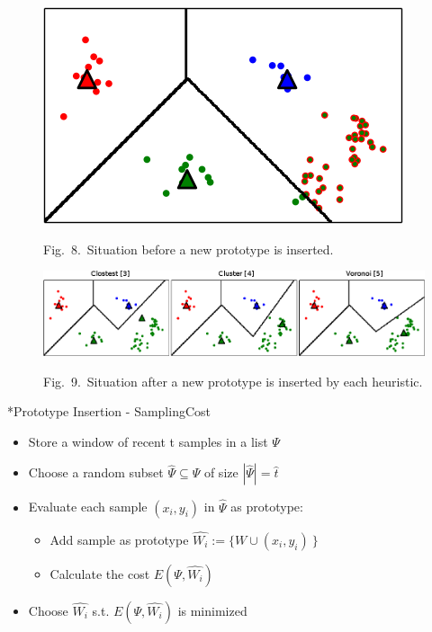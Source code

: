 \documentclass{article}
\makeatletter
\renewcommand{\subsection}{%
\@startsection{subsection}{1}{0pt}{2ex}{1ex}{%
\color[rgb]{0,0.4078,0.7059}
\fontsize{11mm}{11mm}\sffamily\bfseries}}
\makeatother
\begin{document}
\begin{multicols}{3}
\begin{minipage}[c]{0.58\linewidth}
\end{minipage}
\begin{minipage}[c]{0.4\linewidth}
\begin{figure}[H]
\begin{center}
\includegraphics[width=1\linewidth]{Images/General/Insertions1.png}
\end{center}
{\myCaption Fig.~8.~Situation before a new prototype is inserted.}
\end{figure}
\end{minipage}

\begin{figure}[H]
\includegraphics[width=1\linewidth]{Images/General/PlacementHeuristics.png}
\begin{center}
{\myCaption Fig.~9.~Situation after a new prototype is inserted by each heuristic.} 
\end{center}
\end{figure}


\subsection*{Prototype Insertion - SamplingCost}
\begin{itemize}
	\item Store a window of recent t samples in a list $\Psi$
	\item Choose a random subset $\hat{\Psi}\subseteq \Psi$ of size $|\hat{\Psi}|=\hat{t}$
	\item Evaluate each sample $(x_i,y_i)$ in $\hat{\Psi}$ as prototype:
	\begin{itemize}
	\item Add sample as prototype $\hat{W_i}:= \{W\cup (x_i,y_i)\ \}$
	\item Calculate the cost $E(\Psi, \hat{W_i})$
	\end{itemize}
	\item Choose $\hat{W_i}$ s.t. $E(\Psi, \hat{W_i})$ is minimized
\end{itemize}


\end{multicols}
\end{document}
